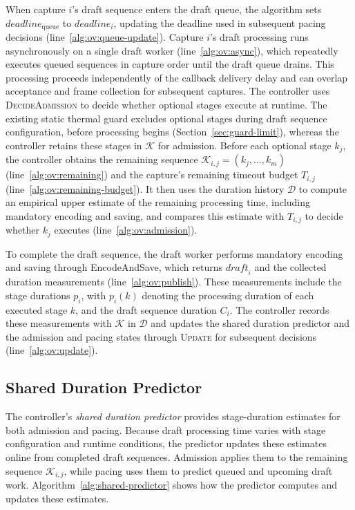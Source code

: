 When capture \(i\)'s draft sequence enters the draft queue, the algorithm sets \(\mathit{deadline}_{\mathrm{queue}}\) to \(\mathit{deadline}_i\), updating the deadline used in subsequent pacing decisions (line~\ref{alg:ov:queue-update}).
Capture \(i\)'s draft processing runs asynchronously on a single draft worker (line~\ref{alg:ov:async}), which repeatedly executes queued sequences in capture order until the draft queue drains.
This processing proceeds independently of the callback delivery delay and can overlap acceptance and frame collection for subsequent captures.
The controller uses \textsc{DecideAdmission} to decide whether optional stages execute at runtime.
The existing static thermal guard excludes optional stages during draft sequence configuration, before processing begins (Section~\ref{sec:guard-limit}), whereas the controller retains these stages in \(\mathcal K\) for admission.
Before each optional stage \(k_j\), the controller obtains the remaining sequence \(\mathcal K_{i,j}=(k_j,\ldots,k_m)\) (line~\ref{alg:ov:remaining}) and the capture's remaining timeout budget \(T_{i,j}\) (line~\ref{alg:ov:remaining-budget}).
It then uses the duration history \(\mathcal D\) to compute an empirical upper estimate of the remaining processing time, including mandatory encoding and saving, and compares this estimate with \(T_{i,j}\) to decide whether \(k_j\) executes (line~\ref{alg:ov:admission}).

To complete the draft sequence, the draft worker performs mandatory encoding and saving through \textsf{EncodeAndSave}, which returns \(\mathit{draft}_i\) and the collected duration measurements (line~\ref{alg:ov:publish}).
These measurements include the stage durations \(p_i\), with \(p_i(k)\) denoting the processing duration of each executed stage \(k\), and the draft sequence duration \(C_i\).
The controller records these measurements with \(\mathcal K\) in \(\mathcal D\) and updates the shared duration predictor and the admission and pacing states through \textsc{Update} for subsequent decisions (line~\ref{alg:ov:update}).

\subsection{Shared Duration Predictor}
\label{sec:model}

The controller's \emph{shared duration predictor} provides stage-duration estimates for both admission and pacing.
Because draft processing time varies with stage configuration and runtime conditions, the predictor updates these estimates online from completed draft sequences.
Admission applies them to the remaining sequence \(\mathcal K_{i,j}\), while pacing uses them to predict queued and upcoming draft work.
Algorithm~\ref{alg:shared-predictor} shows how the predictor computes and updates these estimates.

